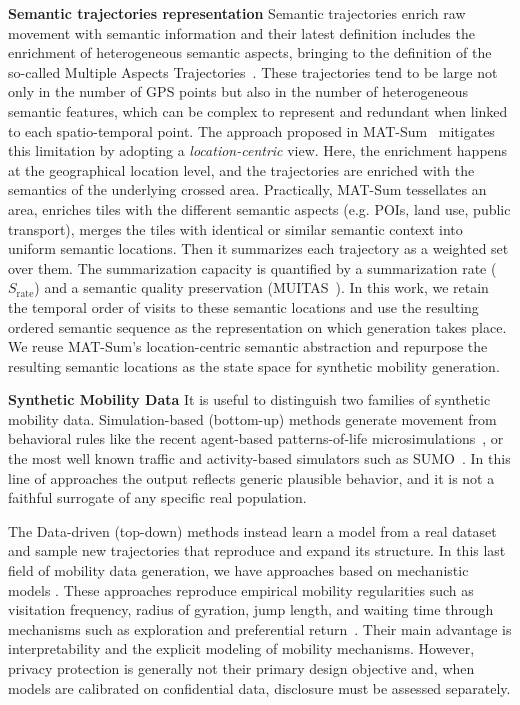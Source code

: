 \documentclass[sigconf,nonacm]{acmart}
\begin{document}
\textbf{Semantic trajectories representation}
Semantic trajectories enrich raw movement with semantic information \cite{spaccapietra2008} and their latest definition includes the enrichment of heterogeneous
semantic aspects, bringing to the definition of the so-called Multiple Aspects Trajectories~\cite{bogorny2019}. These trajectories tend to be large not only in the number of GPS points but also in the number of heterogeneous semantic features, which can be complex to represent and redundant when linked to each spatio-temporal point. 
The approach proposed in MAT-Sum~\cite{pugliese2023} mitigates this limitation by adopting a \emph{location-centric} view. Here, the enrichment happens at the geographical location level, and the trajectories are enriched with the semantics of the underlying crossed area. Practically, MAT-Sum tessellates an area, enriches tiles with the different semantic aspects (e.g. POIs, land use, public transport), merges the tiles with identical or similar semantic context into uniform semantic locations. Then it
summarizes each trajectory as a weighted set over them. The summarization capacity is quantified by a summarization rate
($S_{\text{rate}}$) and a semantic quality preservation (MUITAS~\cite{petry2019}). In this work, we retain the temporal order of visits to these semantic
locations and use the resulting ordered semantic sequence as the
representation on which generation takes place.
We reuse MAT-Sum's location-centric semantic abstraction and
repurpose the resulting semantic locations as the state space for
synthetic mobility generation.

\textbf{Synthetic Mobility Data }
It is useful to distinguish two families of synthetic mobility data. Simulation-based (bottom-up) methods generate movement from behavioral rules like the recent agent-based patterns-of-life microsimulations~\cite{zuefle_pol}, or the most well known traffic and activity-based simulators such as SUMO~\cite{krajzewicz2002}. 
In this line of approaches the output reflects generic plausible behavior, and it is not a faithful surrogate of any specific real population.

The Data-driven (top-down) methods instead learn a model from a real dataset and sample new trajectories that reproduce and expand its structure.
In this last field of mobility data generation, we have approaches based on mechanistic models . These approaches reproduce empirical mobility regularities
such as visitation frequency, radius of gyration, jump length, and waiting time through mechanisms such as exploration and preferential
return~\cite{song2010,pappalardo2018}. Their main advantage is
interpretability and the explicit modeling of mobility mechanisms. However, privacy protection is generally not their primary design objective and, when models are calibrated on confidential data, disclosure must be assessed separately.
\end{document}
